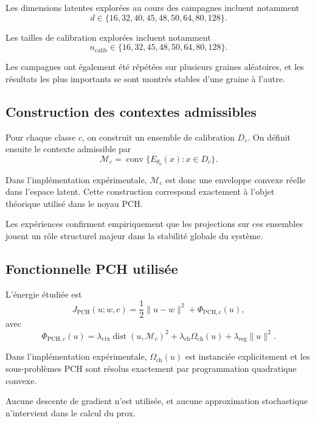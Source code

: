 \documentclass[11pt,a4paper]{article}
\newcommand{\1}{\mathbf 1}
\begin{document}
Les dimensions latentes explorées au cours des campagnes incluent notamment
\[
d \in \{16,32,40,45,48,50,64,80,128\}.
\]

Les tailles de calibration explorées incluent notamment
\[
n_{\mathrm{calib}} \in \{16,32,45,48,50,64,80,128\}.
\]

Les campagnes ont également été répétées sur plusieurs graines aléatoires, et les résultats les plus importants se sont montrés stables d’une graine à l’autre.

\subsection{Construction des contextes admissibles}

Pour chaque classe \(c\), on construit un ensemble de calibration \(D_c\). On définit ensuite le contexte admissible par
\[
\mathcal M_c = \operatorname{conv}\{E_{\theta_0}(x) : x \in D_c\}.
\]

Dans l’implémentation expérimentale, \(\mathcal M_c\) est donc une enveloppe convexe réelle dans l’espace latent. Cette construction correspond exactement à l’objet théorique utilisé dans le noyau PCH.

Les expériences confirment empiriquement que les projections sur ces ensembles jouent un rôle structurel majeur dans la stabilité globale du système.

\subsection{Fonctionnelle PCH utilisée}

L’énergie étudiée est
\[
J_{\mathrm{PCH}}(u;w,c)
=
\frac12\|u-w\|^2 + \Phi_{\mathrm{PCH},c}(u),
\]
avec
\[
\Phi_{\mathrm{PCH},c}(u)
=
\lambda_{\mathrm{ctx}}\operatorname{dist}(u,\mathcal M_c)^2
+
\lambda_{\mathrm{ch}}\Omega_{\mathrm{ch}}(u)
+
\lambda_{\mathrm{reg}}\|u\|^2.
\]

Dans l’implémentation expérimentale, \(\Omega_{\mathrm{ch}}(u)\) est instanciée explicitement et les sous-problèmes PCH sont résolus exactement par programmation quadratique convexe.

Aucune descente de gradient n’est utilisée, et aucune approximation stochastique n’intervient dans le calcul du prox.
\end{document}
